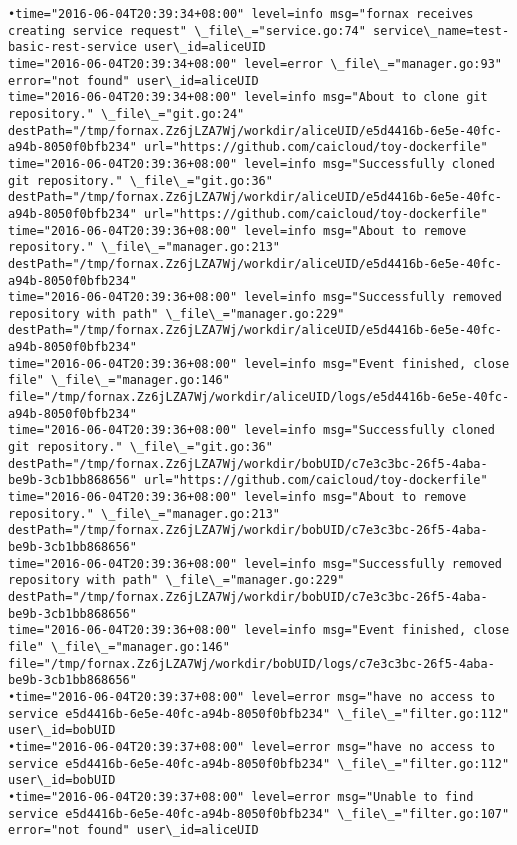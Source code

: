 \begin{lstlisting}[caption={Fornax功能性测试日志}]
•time="2016-06-04T20:39:34+08:00" level=info msg="fornax receives creating service request" \_file\_="service.go:74" service\_name=test-basic-rest-service user\_id=aliceUID 
time="2016-06-04T20:39:34+08:00" level=error \_file\_="manager.go:93" error="not found" user\_id=aliceUID 
time="2016-06-04T20:39:34+08:00" level=info msg="About to clone git repository." \_file\_="git.go:24" destPath="/tmp/fornax.Zz6jLZA7Wj/workdir/aliceUID/e5d4416b-6e5e-40fc-a94b-8050f0bfb234" url="https://github.com/caicloud/toy-dockerfile" 
time="2016-06-04T20:39:36+08:00" level=info msg="Successfully cloned git repository." \_file\_="git.go:36" destPath="/tmp/fornax.Zz6jLZA7Wj/workdir/aliceUID/e5d4416b-6e5e-40fc-a94b-8050f0bfb234" url="https://github.com/caicloud/toy-dockerfile" 
time="2016-06-04T20:39:36+08:00" level=info msg="About to remove repository." \_file\_="manager.go:213" destPath="/tmp/fornax.Zz6jLZA7Wj/workdir/aliceUID/e5d4416b-6e5e-40fc-a94b-8050f0bfb234" 
time="2016-06-04T20:39:36+08:00" level=info msg="Successfully removed repository with path" \_file\_="manager.go:229" destPath="/tmp/fornax.Zz6jLZA7Wj/workdir/aliceUID/e5d4416b-6e5e-40fc-a94b-8050f0bfb234" 
time="2016-06-04T20:39:36+08:00" level=info msg="Event finished, close file" \_file\_="manager.go:146" file="/tmp/fornax.Zz6jLZA7Wj/workdir/aliceUID/logs/e5d4416b-6e5e-40fc-a94b-8050f0bfb234" 
time="2016-06-04T20:39:36+08:00" level=info msg="Successfully cloned git repository." \_file\_="git.go:36" destPath="/tmp/fornax.Zz6jLZA7Wj/workdir/bobUID/c7e3c3bc-26f5-4aba-be9b-3cb1bb868656" url="https://github.com/caicloud/toy-dockerfile" 
time="2016-06-04T20:39:36+08:00" level=info msg="About to remove repository." \_file\_="manager.go:213" destPath="/tmp/fornax.Zz6jLZA7Wj/workdir/bobUID/c7e3c3bc-26f5-4aba-be9b-3cb1bb868656" 
time="2016-06-04T20:39:36+08:00" level=info msg="Successfully removed repository with path" \_file\_="manager.go:229" destPath="/tmp/fornax.Zz6jLZA7Wj/workdir/bobUID/c7e3c3bc-26f5-4aba-be9b-3cb1bb868656" 
time="2016-06-04T20:39:36+08:00" level=info msg="Event finished, close file" \_file\_="manager.go:146" file="/tmp/fornax.Zz6jLZA7Wj/workdir/bobUID/logs/c7e3c3bc-26f5-4aba-be9b-3cb1bb868656" 
•time="2016-06-04T20:39:37+08:00" level=error msg="have no access to service e5d4416b-6e5e-40fc-a94b-8050f0bfb234" \_file\_="filter.go:112" user\_id=bobUID 
•time="2016-06-04T20:39:37+08:00" level=error msg="have no access to service e5d4416b-6e5e-40fc-a94b-8050f0bfb234" \_file\_="filter.go:112" user\_id=bobUID 
•time="2016-06-04T20:39:37+08:00" level=error msg="Unable to find service e5d4416b-6e5e-40fc-a94b-8050f0bfb234" \_file\_="filter.go:107" error="not found" user\_id=aliceUID 

\end{lstlisting}
